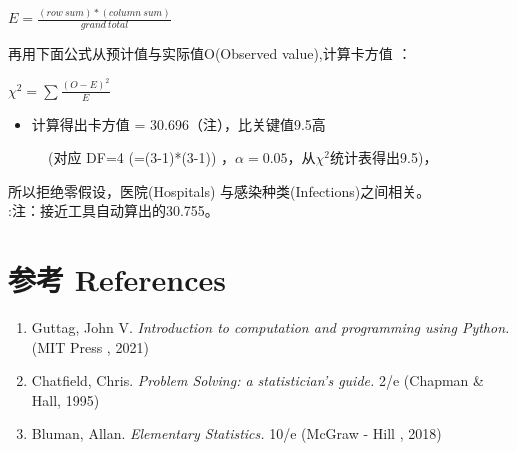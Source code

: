 \(E = \frac{(row \ sum) * (column \ sum)} {grand \ total}\)

再用下面公式从预计值与实际值O(Observed value),计算卡方值 ：

\(\chi ^2 = \sum \frac{(O - E)^2} {E}\)

\begin{itemize}
\tightlist
\item
  计算得出卡方值 = 30.696（注），比关键值9.5高
\end{itemize}

\begin{description}
\item[]
(对应 DF=4 (=(3-1)*(3-1))
，\(\alpha = 0.05\)，从\(\chi ^2\)统计表得出9.5)，\\
\end{description}

所以拒绝零假设，医院(Hospitals) 与感染种类(Infections)之间相关。\\
:注：接近工具自动算出的30.755。

\hypertarget{ux53c2ux8003-references}{%
\section{参考 References}\label{ux53c2ux8003-references}}

\begin{enumerate}
\tightlist
\item
  Guttag, John V. \emph{Introduction to computation and programming
  using Python.} (MIT Press , 2021)\\
\item
  Chatfield, Chris. \emph{Problem Solving: a statistician's guide.} 2/e
  (Chapman \& Hall, 1995)\\
\item
  Bluman, Allan. \emph{Elementary Statistics.} 10/e (McGraw - Hill ,
  2018)\\
\end{enumerate}

